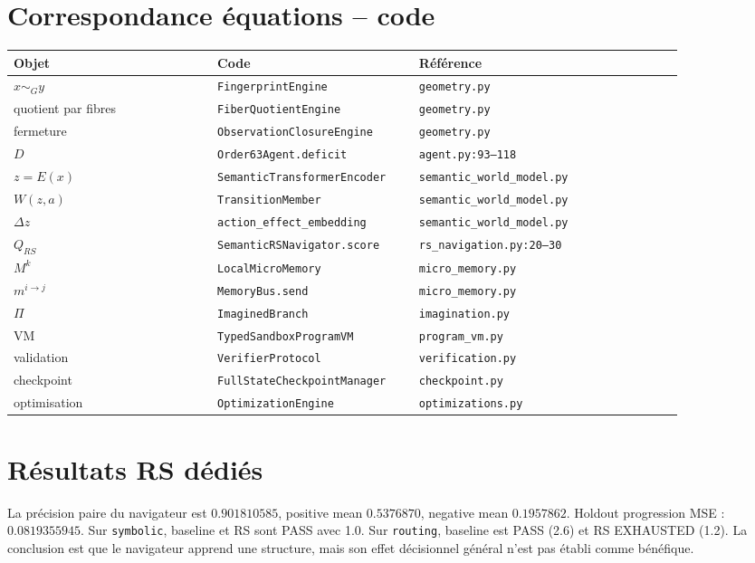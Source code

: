\documentclass[11pt,a4paper]{article}
\newcommand{\code}[1]{\texttt{#1}}
\begin{document}
\section{Correspondance équations -- code}
\begin{longtable}{p{0.27\linewidth}p{0.24\linewidth}p{0.35\linewidth}}
\toprule
Objet & Code & Référence\\
\midrule
$ x\sim_G y $ & \code{FingerprintEngine} & \code{geometry.py}\\
quotient par fibres & \code{FiberQuotientEngine} & \code{geometry.py}\\
fermeture & \code{ObservationClosureEngine} & \code{geometry.py}\\
$D$ & \code{Order63Agent.deficit} & \code{agent.py:93--118}\\
$z=E(x)$ & \code{SemanticTransformerEncoder} & \code{semantic\_world\_model.py}\\
$W(z,a)$ & \code{TransitionMember} & \code{semantic\_world\_model.py}\\
$\Delta z$ & \code{action\_effect\_embedding} & \code{semantic\_world\_model.py}\\
$Q_{RS}$ & \code{SemanticRSNavigator.score} & \code{rs\_navigation.py:20--30}\\
$M^k$ & \code{LocalMicroMemory} & \code{micro\_memory.py}\\
$m^{i\to j}$ & \code{MemoryBus.send} & \code{micro\_memory.py}\\
$\Pi$ & \code{ImaginedBranch} & \code{imagination.py}\\
VM & \code{TypedSandboxProgramVM} & \code{program\_vm.py}\\
validation & \code{VerifierProtocol} & \code{verification.py}\\
checkpoint & \code{FullStateCheckpointManager} & \code{checkpoint.py}\\
optimisation & \code{OptimizationEngine} & \code{optimizations.py}\\
\bottomrule
\end{longtable}

\section{Résultats RS dédiés}
La précision paire du navigateur est $0.901810585$, positive mean $0.5376870$, negative mean $0.1957862$. Holdout progression MSE : $0.0819355945$. Sur \code{symbolic}, baseline et RS sont PASS avec 1.0. Sur \code{routing}, baseline est PASS (2.6) et RS EXHAUSTED (1.2). La conclusion est que le navigateur apprend une structure, mais son effet décisionnel général n’est pas établi comme bénéfique.
\end{document}

